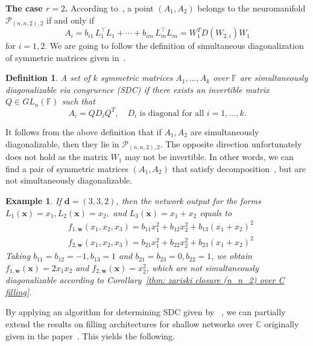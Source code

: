 \documentclass[a4paper]{cas-sc}
\newcommand{\xx}{\textbf{x}}    %
\newcommand{\ww}{\mathbf{w}}    %
\newcommand{\dd}{\mathbf{d}}    %
\newcommand{\F}{\mathbb{F}}
\newtheorem{definition}{Definition}[section]
\newtheorem{example}[theorem]{Example}
\begin{document}
    \noindent
    \textbf{The case $r=2$.} According to~, a point $(A_1, A_2)$ belongs to the neuromanifold $\mathcal{P}_{(n,n,2), 2}$ if and only if 
    \begin{equation}
    \label{eq:nn2-r2-decomposition-formula}
        A_i = b_{i1}\, L_1^\top L_1 + \cdots + b_{im}\, L_m^\top L_m = W_1^TD(W_{2,i})W_1
    \end{equation}
    for $i=1,2$. We are going to follow the definition of simultaneous diagonalization of symmetric matrices given in~\citet{BUSTAMANTE20}. 
    \begin{definition}
        A set of $k$ symmetric matrices $A_1,\dots,A_k$ over $\F$ are \textit{simultaneously diagonalizable via congruence} (SDC) if there exists an invertible matrix $Q \in GL_n(\F)$ such that
        \[
            A_i = QD_iQ^T, \quad \text{$D_i$ is diagonal for all $i = 1, ..., k$.}
        \]
    \end{definition}
    It follows from the above definition that if $A_1, A_2$ are simultaneously diagonalizable, then they lie in $\mathcal{P}_{(n,n,2), 2}$. The opposite direction unfortunately does not hold as the matrix $W_1$ may not be invertible. In other words, we can find a pair of symmetric matrices $(A_1,A_2)$ that satisfy decomposition~, but are not simultaneously diagonalizable.
    \begin{example}
        If $\dd=(3,3,2)$, then the network output for the forms $L_1(\xx)=x_1, L_2(\xx)=x_2,$ and $L_3(\xx)=x_1+x_2$ equals to
        \[
        \begin{aligned}
            & f_{1,\ww}(x_1,x_2,x_3) = b_{11}x_1^2 + b_{12}x_2^2 + b_{13}(x_1+x_2)^2\\
            & f_{2,\ww}(x_1,x_2,x_3) = b_{21}x_1^2 + b_{22}x_2^2 + b_{23}(x_1+x_2)^2
        \end{aligned}
        \]
        Taking $b_{11}=b_{12}=-1, b_{13}=1$ and $b_{21} = b_{23} =0, b_{22}=1$, we obtain $f_{1,\ww}(\xx) = 2x_1x_2$ and $f_{2,\ww}(\xx)=x_2^2$, which are not simultaneously diagonalizable according to Corollary~\ref{thm: zariski closure (n_n_2) over C filling}. 
    \end{example}
    
    By applying an algorithm for determining SDC given by ~\citet{BUSTAMANTE20}, we can partially extend the results on filling architectures for shallow networks over $\mathbb{C}$ originally given in the paper~\cite{KUBJAS24}. This yields the following.
    
\end{document}
